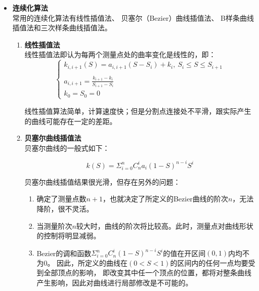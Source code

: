 \begin{itemize}

    \item \textbf{连续化算法} \\

    常用的连续化算法有线性插值法、
    贝塞尔（Bezier）曲线插值法、
    B样条曲线插值法和三次样条曲线插值法。

    \begin{enumerate}[label=(\Alph*)]
        \item \textbf{线性插值法} \\
        线性插值法即认为每两个测量点处的曲率变化是线性的，即：
        \begin{equation}
        \left\{
            \begin{array}{lr}
            k_{i, i+1} (S) = a_{i, i+1} (S - S_i) + k_i, \ S_i\leq S\leq S_{i+1}\\
        \\
            a_{i, i+1} = \frac{k_{i+1} - k_i}{S_{i+1} - S_i}
        \\
            k_0 = S_0 = 0
            \end{array}
        \right.
        \end{equation}

        线性插值算法简单，计算速度快；但是分割点连接处不平滑，跟实际产生的曲线可能存在一定的差距。

        \item \textbf{贝塞尔曲线插值法} \\
        贝塞尔曲线的一般式如下：

        \begin{equation}
            k(S) = \Sigma_{i=0}^nC_n ^ i a_i(1-S)^{n - i}S^i
        \end{equation}

        贝塞尔曲线插值结果很光滑，但存在另外的问题：

        \begin{enumerate}[label=(\alph*)]
            \item 确定了测量点数$n+1$，也就决定了所定义的Bezier曲线的阶次$n$，无法降阶，很不灵活。
            \item 当测量阶次$n$较大时，曲线的阶次将比较高。此时，测量点对曲线形状的控制将明显减弱。
            \item Bezier的调和函数$\Sigma_{i=0}^nC_n ^ i (1-S)^{n - i}S^i$的值在开区间$(0,1)$内均不为0。
            因此，所定义的曲线在$(0<S<1)$的区间内的任何一点均要受到全部顶点的影响，
            即改变其中任一个顶点的位置，都将对整条曲线产生影响，因此对曲线进行局部修改是不可能的。
        \end{enumerate}


\end{enumerate}
\end{itemize}

